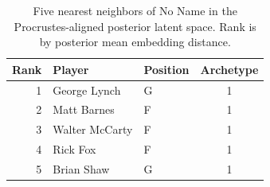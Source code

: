 \begin{table}[htbp]
  \centering\small
  \begin{tabular}{rllc}
    \toprule
    Rank & Player & Position & Archetype \\
    \midrule
    1 & George Lynch & G & 1 \\
    2 & Matt Barnes & F & 1 \\
    3 & Walter McCarty & F & 1 \\
    4 & Rick Fox & F & 1 \\
    5 & Brian Shaw & G & 1 \\
    \bottomrule
  \end{tabular}
  \caption{Five nearest neighbors of No Name in the Procrustes-aligned posterior latent space. Rank is by posterior mean embedding distance.}
  \label{tab:No_Name_neighbors}
\end{table}


